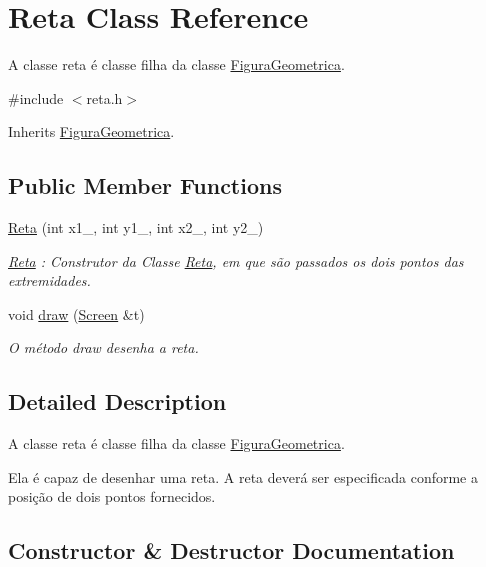 \hypertarget{class_reta}{}\section{Reta Class Reference}
\label{class_reta}


A classe reta é classe filha da classe \hyperlink{class_figura_geometrica}{Figura\+Geometrica}.  




{\ttfamily \#include $<$reta.\+h$>$}



Inherits \hyperlink{class_figura_geometrica}{Figura\+Geometrica}.

\subsection*{Public Member Functions}
\begin{DoxyCompactItemize}
\item 
\hyperlink{class_reta_a9e125389d2176bba3c1430f5041beb83}{Reta} (int x1\+\_\+, int y1\+\_\+, int x2\+\_\+, int y2\+\_\+)
\begin{DoxyCompactList}\small\item\em \hyperlink{class_reta}{Reta} \+: Construtor da Classe \hyperlink{class_reta}{Reta}, em que são passados os dois pontos das extremidades. \end{DoxyCompactList}\item 
void \hyperlink{class_reta_ac2e9805183cd474b62bffd8b032cd780}{draw} (\hyperlink{class_screen}{Screen} \&t)
\begin{DoxyCompactList}\small\item\em O método draw desenha a reta. \end{DoxyCompactList}\end{DoxyCompactItemize}


\subsection{Detailed Description}
A classe reta é classe filha da classe \hyperlink{class_figura_geometrica}{Figura\+Geometrica}. 

Ela é capaz de desenhar uma reta. A reta deverá ser especificada conforme a posição de dois pontos fornecidos. 

\subsection{Constructor \& Destructor Documentation}
\mbox{\label{class_reta_a9e125389d2176bba3c1430f5041beb83}} 

